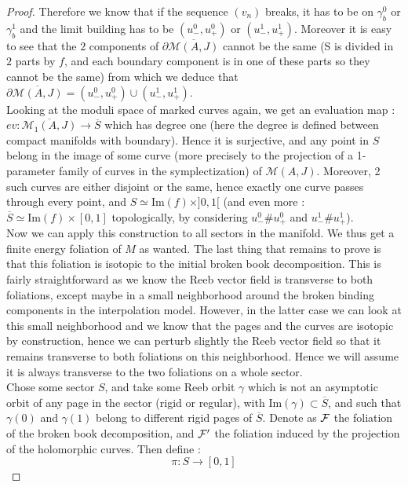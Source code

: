 \documentclass[../main.tex]{subfiles}
\begin{document}
\begin{proof}
Therefore we know that if the sequence $(v_n)$ breaks, it has to be on $\gamma_b^0$ or $\gamma_b^1$ and the limit building has to be $(u_-^0,u_+^0)$ or $(u_-^1,u_+^1)$. Moreover it is easy to see that the $2$ components of $\partial\overline{\mathcal{M}(A,J)}$ cannot be the same (S is divided in $2$ parts by $f$, and each boundary component is in one of these parts so they cannot be the same) from which we deduce that $\partial\overline{\mathcal{M}(A,J)} = (u_-^0,u_+^0)\cup(u_-^1,u_+^1)$. \\

Looking at the moduli space of marked curves again, we get an evaluation map : $ev :\overline{\mathcal{M}_1(A,J)}\rightarrow \overline{S}$ which has degree one (here the degree is defined between compact manifolds with boundary). Hence it is surjective, and any point in $S$ belong in the image of some curve (more precisely to the projection of a 1-parameter family of curves in the symplectization) of $\mathcal{M}(A,J)$. Moreover, 2 such curves are either disjoint or the same, hence exactly one curve passes through every point, and $S\simeq \text{Im}(f)\times ]0,1[$ (and even more : $\overline{S} \simeq \text{Im}(f)\times [0,1]$ topologically, by considering $u_-^0\#u_+^0$ and $u_-^1\#u_+^1$). \\

Now we can apply this construction to all sectors in the manifold. We thus get a finite energy foliation of $M$ as wanted. The last thing that remains to prove is that this foliation is isotopic to the initial broken book decomposition. This is fairly straightforward as we know the Reeb vector field is transverse to both foliations, except maybe in a small neighborhood around the broken binding components in the interpolation model. However, in the latter case we can look at this small neighborhood and we know that the pages and the curves are isotopic by construction, hence we can perturb slightly the Reeb vector field so that it remains transverse to both foliations on this neighborhood. Hence we will assume it is always transverse to the two foliations on a whole sector.\\

Chose some sector $S$, and take some Reeb orbit $\gamma$ which is not an asymptotic orbit of any page in the sector (rigid or regular), with $\text{Im}(\gamma)\subset \overline{S}$, and such that $\gamma(0)$ and $\gamma(1)$ belong to different rigid pages of $\overline{S}$. Denote as $\mathcal{F}$ the foliation of the broken book decomposition, and $\mathcal{F}'$ the foliation induced by the projection of the holomorphic curves. Then define : 
$$\pi : S \rightarrow [0,1]$$


\end{proof}
\end{document}
